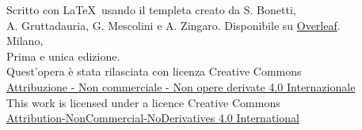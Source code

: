 \documentclass{Configuration_Files/PoliMi3i_thesis}
\begin{document}


\pagestyle{empty} %
\frontmatter %



\newpage
\thispagestyle{empty}
\begin{minipage}{0.6\textwidth}
    \vspace{18cm}
    \scriptsize Scritto con \LaTeX\ usando il templeta creato da S. Bonetti, \\ A. Gruttadauria, G. Mescolini e A. Zingaro. Disponibile su \href{https://www.overleaf.com/latex/templates/classical-format-thesis-scuola-di-ingegneria-industriale-e-dellinformazione-politecnico-di-milano/dkmvtndqkyxg}{Overleaf}. \\[4ex]
    Milano,  \\ Prima e unica edizione. \\[4ex] 
    Quest’opera è stata rilasciata con licenza Creative Commons\\ \href{https://creativecommons.org/licenses/by-nc-nd/4.0/deed.it}{Attribuzione - Non commerciale - Non opere derivate 4.0 Internazionale}\\[3ex] 
    This work is licensed under a licence Creative Commons\\ \href{https://creativecommons.org/licenses/by-nc-nd/4.0/deed.en}{Attribution-NonCommercial-NoDerivatives 4.0 International}
\end{minipage}
\end{document}
